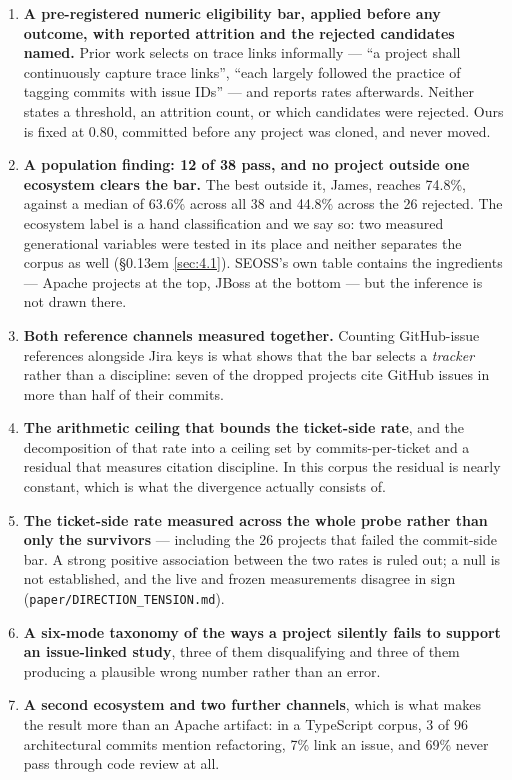 \documentclass[11pt,a4paper]{article}
\begin{document}
\begin{enumerate}
\item \textbf{A pre-registered numeric eligibility bar, applied before any outcome, with reported attrition and the rejected candidates named.} Prior work selects on trace links informally --- ``a project shall continuously capture trace links'', ``each largely followed the practice of tagging commits with issue IDs'' --- and reports rates afterwards. Neither states a threshold, an attrition count, or which candidates were rejected. Ours is fixed at 0.80, committed before any project was cloned, and never moved.
\item \textbf{A population finding: 12 of 38 pass, and no project outside one ecosystem clears the bar.} The best outside it, James, reaches 74.8\%, against a median of 63.6\% across all 38 and 44.8\% across the 26 rejected. The ecosystem label is a hand classification and we say so: two measured generational variables were tested in its place and neither separates the corpus as well (\S\kern0.13em \ref{sec:4.1}). SEOSS's own table contains the ingredients --- Apache projects at the top, JBoss at the bottom --- but the inference is not drawn there.
\item \textbf{Both reference channels measured together.} Counting GitHub-issue references alongside Jira keys is what shows that the bar selects a \emph{tracker} rather than a discipline: seven of the dropped projects cite GitHub issues in more than half of their commits.
\item \textbf{The arithmetic ceiling that bounds the ticket-side rate}, and the decomposition of that rate into a ceiling set by commits-per-ticket and a residual that measures citation discipline. In this corpus the residual is nearly constant, which is what the divergence actually consists of.
\item \textbf{The ticket-side rate measured across the whole probe rather than only the survivors} --- including the 26 projects that failed the commit-side bar. A strong positive association between the two rates is ruled out; a null is not established, and the live and frozen measurements disagree in sign (\texttt{paper/\allowbreak{}DIRECTION\_\allowbreak{}TENSION.\allowbreak{}md}).
\item \textbf{A six-mode taxonomy of the ways a project silently fails to support an issue-linked study}, three of them disqualifying and three of them producing a plausible wrong number rather than an error.
\item \textbf{A second ecosystem and two further channels}, which is what makes the result more than an Apache artifact: in a TypeScript corpus, 3 of 96 architectural commits mention refactoring, 7\% link an issue, and 69\% never pass through code review at all.
\end{enumerate}
\end{document}
